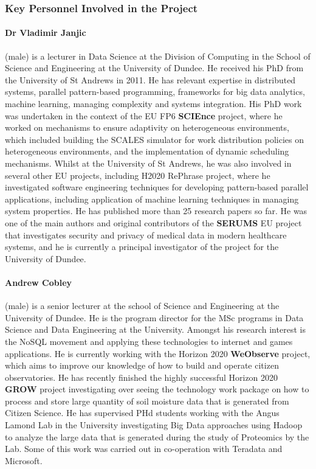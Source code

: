 \documentclass[a4paper,11pt]{article}
\begin{document}
\subsubsection*{Key Personnel Involved in the Project}

\paragraph{Dr Vladimir Janjic} (male) is a lecturer in Data Science at the Division of Computing in the School of Science and Engineering at the University of Dundee. He received his PhD from the University of St Andrews in 2011. He has relevant expertise in distributed systems, parallel pattern-based programming, frameworks for big data analytics, machine learning, managing complexity and systems integration. His PhD work was undertaken in the context of the EU FP6 \textbf{SCIEnce} project, where he worked on mechanisms to ensure adaptivity on heterogeneous environments, which included building the SCALES simulator for work distribution policies on heterogeneous environments, and the implementation of dynamic scheduling mechanisms. Whilst at the University of St Andrews, he was also involved in several other EU projects, including H2020 RePhrase project, where he investigated software engineering techniques for developing pattern-based parallel applications, including application of machine learning techniques in managing system properties. He has published more than 25 research papers so far. He was one of the main authors and original contributors of the \textbf{SERUMS} EU project that investigates security and privacy of medical data in modern healthcare systems, and he is currently a principal investigator of the project for the University of Dundee.

\paragraph{Andrew Cobley} (male) is a senior lecturer at the school of Science and Engineering at the University of Dundee.    He is the program director for the MSc programs in Data Science and Data Engineering at the University.   Amongst his research interest is the NoSQL movement and applying these technologies to internet and games applications. He is currently working with the Horizon 2020 \textbf{WeObserve} project, which aims to improve our knowledge of how to build and operate citizen observatories. He has recently finished the highly successful Horizon 2020 \textbf{GROW} project investigating over seeing the technology work package on how to process and store large quantity of  soil moisture data  that is generated from Citizen Science.  He has supervised PHd students working with the Angus Lamond Lab in the University investigating Big Data approaches using Hadoop to analyze the large data that is generated during the study of Proteomics by the Lab.  Some of this work was carried out in co-operation with Teradata and Microsoft.
\end{document}
